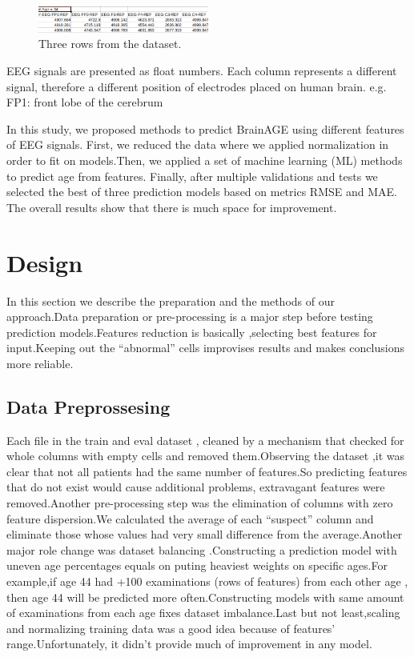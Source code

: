 \begin{figure}[h!]
  \includegraphics[width=0.5\textwidth]{ds_lines}
\caption{Three rows from the dataset.}
\end{figure}

EEG signals are presented as float numbers. Each column represents a different signal, therefore a different position of electrodes placed on human brain. 
e.g. FP1: front lobe of the cerebrum
\par
In this study, we proposed methods to predict BrainAGE using different features of EEG signals. First, we reduced the data where we applied normalization in order to fit on models.Then, we applied a set of machine learning (ML) methods to predict age from features. Finally, after multiple validations and tests we selected the best of three prediction models based on metrics RMSE and MAE. The overall results show that there is much space for improvement.



\section{Design}
In this section we describe the preparation and the methods of our approach.Data preparation or pre-processing is a major step before testing prediction models.Features reduction is basically ,selecting best features for input.Keeping out the “abnormal” cells improvises results and makes conclusions more reliable.

\subsection{Data Preprossesing}

Each file in the train and eval dataset , cleaned by a mechanism that checked for whole columns with empty cells and removed them.Observing the dataset ,it was clear that not all patients had the same number of features.So predicting features that do not exist would cause additional problems, extravagant features were removed.Another pre-processing step was the elimination of columns with zero feature dispersion.We calculated the average of each “suspect” column and eliminate those whose values had very small difference from the average.Another major role change was dataset balancing .Constructing a prediction model with uneven age percentages equals on puting heaviest weights on specific ages.For example,if age 44 had +100 examinations (rows of features) from each other age , then age 44 will be predicted more often.Constructing models with same amount of examinations from each age fixes dataset imbalance.Last but not least,scaling and normalizing training data was a good idea because of features’ range.Unfortunately, it didn’t provide much of improvement in any model.

